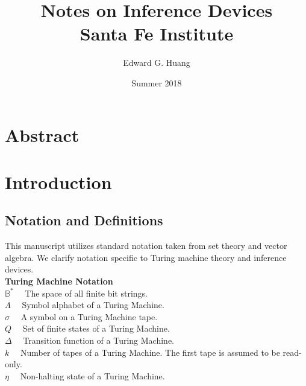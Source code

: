 \documentclass[11pt]{article}
\title{
  Notes on Inference Devices \\
  \bigskip
  \large Santa Fe Institute}
\author{Edward G. Huang}
\date{Summer 2018}
\newcommand{\B}{\mathbb{B}}
\begin{document}
\maketitle 


\section{Abstract} 

 

\section{Introduction} 

\subsection{Notation and Definitions}
This manuscript utilizes standard notation taken from set theory and vector algebra. We clarify notation specific to Turing machine theory and inference devices. \\

\textbf{Turing Machine Notation} \\
$ \B^{*} \quad $ The space of all finite bit strings. \\
$ \Lambda \quad $ Symbol alphabet of a Turing Machine. \\
$ \sigma \quad $ A symbol on a Turing Machine tape. \\
$ Q \quad $ Set of finite states of a Turing Machine. \\
$ \Delta \quad $ Transition function of a Turing Machine. \\
$ k \quad $ Number of tapes of a Turing Machine. The first tape is assumed to be read-only. \\
$ \eta \quad $ Non-halting state of a Turing Machine. \\
\end{document}
